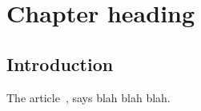 ﻿\chapter{Chapter heading} %
%


\section{Introduction} %

The article~\cite{gibbert08}, says blah blah blah.
